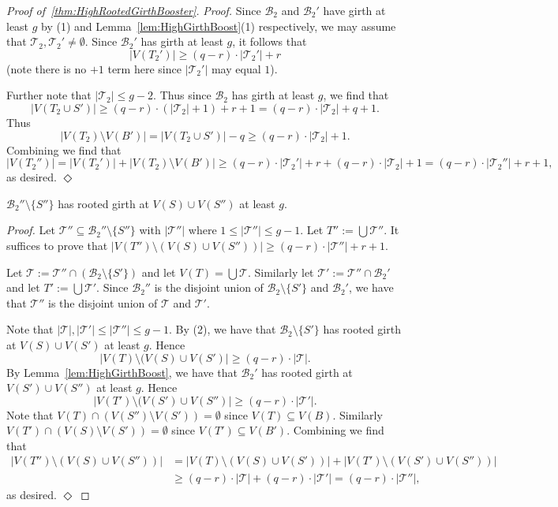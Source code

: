 \documentclass[11pt]{article}
\newcounter{i}
\theoremstyle{plain}
\newenvironment{proofclaim}[1][]%
{\noindent \emph{Proof.} {}{#1}{}}{\hfill
	$\Diamond$\vspace{1em}}
\renewcommand{\theclaim}{\thetheorem.\arabic{claim}}
\newenvironment{lateproof}[1]
 {%
  \renewcommand{\theclaim}{\ref{#1}.\arabic{claim}}%
  \begin{proof}[Proof of~\cref{#1}]%
 }
 {\end{proof}}
\theoremstyle{plain} %
\theoremstyle{definition}
\begin{document}
\begin{lateproof}{thm:HighRootedGirthBooster}
\begin{proofclaim}
Since $\mathcal{B}_2$ and $\mathcal{B}_2'$ have girth at least $g$ by (1) and Lemma~\ref{lem:HighGirthBoost}(1) respectively, we may assume that $\mathcal{T}_2,\mathcal{T}_2'\ne\emptyset$. Since $\mathcal{B}_2'$ has girth at least $g$, it follows that $$|V(T_2')|\ge (q-r)\cdot |\mathcal{T}_2'| + r$$ 
(note there is no $+1$ term here since $|\mathcal{T}_2'|$ may equal $1$). 

Further note that $|\mathcal{T}_2| \le g-2$. Thus since $\mathcal{B}_2$ has girth at least $g$, we find that 
$$|V(T_2\cup S')| \ge (q-r)\cdot (|\mathcal{T}_2|+1)+r+1=(q-r)\cdot |\mathcal{T}_2| + q + 1.$$
Thus 
$$|V(T_2)\setminus V(B')| =|V(T_2\cup S')|-q\ge (q-r)\cdot |\mathcal{T}_2|+1.$$
Combining we find that
$$|V(T_2'')| = |V(T_2')|+|V(T_2)\setminus V(B')| \ge (q-r)\cdot |\mathcal{T}_2'| + r + (q-r)\cdot |\mathcal{T}_2| + 1 = (q-r)\cdot |\mathcal{T}_2''| + r + 1,$$
as desired.
\end{proofclaim}

\begin{claim}
$\mathcal{B}_2''\setminus \{S''\}$ has rooted girth at $V(S)\cup V(S'')$ at least $g$.
\end{claim}
\begin{proofclaim}
Let $\mathcal{T}'' \subseteq \mathcal{B}_2''\setminus \{S''\}$ with $|\mathcal{T}''|$ where $1\le |\mathcal{T}''| \le g-1$. Let $T'':= \bigcup \mathcal{T}''$. It suffices to prove that $|V(T'')\setminus (V(S)\cup V(S''))|\ge (q-r)\cdot |\mathcal{T}''|+r+1$.

Let $\mathcal{T} := \mathcal{T}''\cap (\mathcal{B}_2\setminus \{S'\})$ and let $V(T) = \bigcup \mathcal{T}$. Similarly let $\mathcal{T}' := \mathcal{T}''\cap \mathcal{B}_2'$ and let $T' := \bigcup \mathcal{T}'$. Since $\mathcal{B}_2''$ is the disjoint union of $\mathcal{B}_2\setminus \{S'\}$ and $\mathcal{B}_2'$, we have that $\mathcal{T}''$ is the disjoint union of $\mathcal{T}$ and $\mathcal{T}'$.

Note that $|\mathcal{T}|, |\mathcal{T}'| \le |\mathcal{T}''| \le g-1$. By (2), we have that $\mathcal{B}_2\setminus \{S'\}$ has rooted girth at $V(S)\cup V(S')$ at least $g$. Hence 
$$|V(T)\setminus (V(S)\cup V(S')| \ge (q-r)\cdot |\mathcal{T}|.$$
By Lemma~\ref{lem:HighGirthBoost}, we have that $\mathcal{B}_2'$ has rooted girth at $V(S')\cup V(S'')$ at least $g$. 
Hence 
$$|V(T')\setminus (V(S')\cup V(S'')| \ge (q-r)\cdot |\mathcal{T}'|.$$
Note that $V(T)\cap (V(S'')\setminus V(S')) = \emptyset$ since $V(T)\subseteq V(B)$. Similarly $V(T')\cap (V(S)\setminus V(S')) = \emptyset$ since $V(T')\subseteq V(B')$. Combining we find that
\begin{align*}
|V(T'')\setminus (V(S)\cup V(S''))| &= |V(T)\setminus (V(S)\cup V(S'))| + |V(T')\setminus (V(S')\cup V(S''))| \\
&\ge (q-r)\cdot |\mathcal{T}| + (q-r)\cdot |\mathcal{T}'| = (q-r)\cdot |\mathcal{T}''|,
\end{align*}
as desired.
\end{proofclaim}

\end{lateproof}
\end{document}
